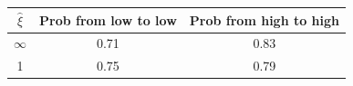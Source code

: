 \begin{tabular}{ccc}
\hline
\rule{0pt}{1.2em}
$\widehat \xi$  &Prob from low to low& Prob from high to high \\
\hline
$\infty$ &  0.71 & 0.83 \\
1 &  0.75 & 0.79 \\


\hline
\end{tabular}
